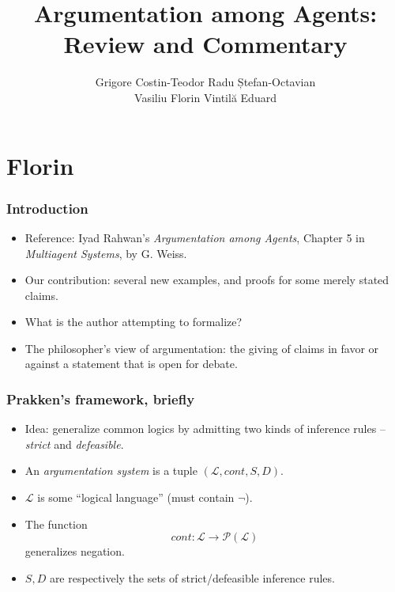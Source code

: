 \documentclass{beamer}
\title{Argumentation among Agents:\\Review and Commentary}
\author{Grigore Costin-Teodor \quad Radu Ștefan-Octavian \\ Vasiliu Florin \quad Vintilă Eduard}
\date{}
\begin{document}
\maketitle

\section{Florin}

\begin{frame}
\frametitle{Introduction}
\begin{itemize}
\item Reference: Iyad Rahwan's \emph{Argumentation among Agents}, Chapter 5 in \emph{Multiagent Systems}, by G. Weiss. \pause
\item Our contribution: several new examples, and proofs for some merely stated claims. \pause
\item What is the author attempting to formalize? \pause
\item The philosopher's view of argumentation: the giving of claims in favor or against a statement that is open for debate.
\end{itemize}
\end{frame}

\begin{frame}
\frametitle{Prakken's framework, briefly}
\begin{itemize}
\item Idea: generalize common logics by admitting two kinds of inference rules -- \emph{strict} and \emph{defeasible}. \pause
\item An \emph{argumentation system} is a tuple \( (\mathcal{L}, \mathit{cont}, S, D) \). \pause
\item $\mathcal{L}$ is some ``logical language'' (must contain $\neg$). \pause
\item The function \[ \mathit{cont} : \mathcal{L} \rightarrow \mathcal{P(L)} \] generalizes negation. \pause
\item $S, D$ are respectively the sets of strict/defeasible inference rules.
\end{itemize}
\end{frame}
\end{document}
